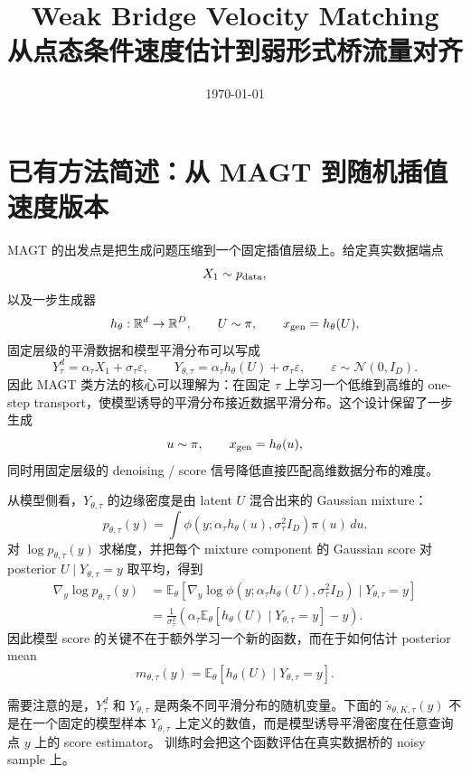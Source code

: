 \documentclass[UTF8,11pt]{ctexart}
\title{Weak Bridge Velocity Matching\\
\large 从点态条件速度估计到弱形式桥流量对齐}
\author{}
\date{\today}
\newcommand{\E}{\mathbb{E}}
\newcommand{\R}{\mathbb{R}}
\begin{document}
\maketitle

\section{已有方法简述：从 MAGT 到随机插值速度版本}

MAGT 的出发点是把生成问题压缩到一个固定插值层级上。给定真实数据端点
\[
X_1\sim p_{\rm data},
\]
以及一步生成器
\[
h_\theta:\R^d\to\R^D,
\qquad
U\sim\pi,
\qquad
x_{\rm gen}=h_\theta(U),
\]
固定层级的平滑数据和模型平滑分布可以写成
\[
Y_\tau^d=\alpha_\tau X_1+\sigma_\tau\varepsilon,
\qquad
Y_{\theta,\tau}=\alpha_\tau h_\theta(U)+\sigma_\tau\varepsilon,
\qquad
\varepsilon\sim\mathcal N(0,I_D).
\]
因此 MAGT 类方法的核心可以理解为：在固定 \(\tau\) 上学习一个低维到高维的 one-step transport，使模型诱导的平滑分布接近数据平滑分布。这个设计保留了一步生成
\[
u\sim\pi,\qquad x_{\rm gen}=h_\theta(u),
\]
同时用固定层级的 denoising / score 信号降低直接匹配高维数据分布的难度。

从模型侧看，\(Y_{\theta,\tau}\) 的边缘密度是由 latent \(U\) 混合出来的 Gaussian mixture：
\[
p_{\theta,\tau}(y)
=
\int
\phi\left(y;\alpha_\tau h_\theta(u),\sigma_\tau^2 I_D\right)\pi(u)\,du .
\]
对 \(\log p_{\theta,\tau}(y)\) 求梯度，并把每个 mixture component 的 Gaussian score 对 posterior
\(U\mid Y_{\theta,\tau}=y\) 取平均，得到
\[
\begin{aligned}
\nabla_y\log p_{\theta,\tau}(y)
&=
\E_\theta\!\left[
\nabla_y\log \phi\left(y;\alpha_\tau h_\theta(U),\sigma_\tau^2 I_D\right)
\mid Y_{\theta,\tau}=y
\right]\\
&=
\frac{1}{\sigma_\tau^2}
\left(
\alpha_\tau
\E_\theta[h_\theta(U)\mid Y_{\theta,\tau}=y]
-y
\right).
\end{aligned}
\]
因此模型 score 的关键不在于额外学习一个新的函数，而在于如何估计 posterior mean
\[
m_{\theta,\tau}(y)=\E_\theta[h_\theta(U)\mid Y_{\theta,\tau}=y].
\]

需要注意的是，\(Y_\tau^d\) 和 \(Y_{\theta,\tau}\) 是两条不同平滑分布的随机变量。下面的
\(\widetilde s_{\theta,K,\tau}(y)\) 不是在一个固定的模型样本
\(Y_{\theta,\tau}\) 上定义的数值，而是模型诱导平滑密度在任意查询点 \(y\) 上的 score estimator。
训练时会把这个函数评估在真实数据桥的 noisy sample 上。
\end{document}
